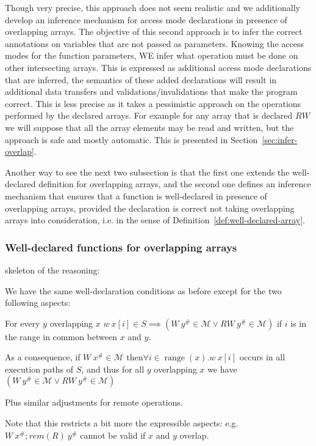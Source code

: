 \documentclass[preprint,12pt]{elsarticle}
\newcommand{\symb}[1]{\textit{#1}}
\newcommand{\rem}[1]{\symb{rem}(#1)}
\newcommand{\abs}[1]{#1^\#}
\newcommand{\AM}{\mathcal{M}}
\DeclareMathOperator{\range}{range}
\begin{document}
Though very precise, this approach does not seem realistic and we additionally develop an inference mechanism for access mode declarations in presence of overlapping arrays.
The objective of this second approach is to infer the correct annotations on  variables that are not passed as parameters. Knowing the access modes for the function parameters, WE infer what operation must be done on other intersecting arrays. This is expressed as additional access mode declarations that are inferred, the semantics of these added declarations will result in additional data transfers and validations/invalidations that make the program correct. This is less precise as it takes a pessimistic approach on the operations performed by the declared arrays. For example for any array that is declared $RW$ we will suppose that all the array elements may be read and written, but the approach is safe and mostly automatic. This is presented in Section~\ref{sec:infer-overlap}. 

Another way to see the next two subsection is that the first one extends the well-declared definition for overlapping arrays, and the second one defines an inference mechanism that ensures that a function is well-declared in presence of overlapping arrays, provided the declaration is correct not taking overlapping arrays into consideration, i.e. in the sense of Definition~\ref{def:well-declared-array}.

\subsubsection{Well-declared functions for overlapping arrays}\label{sec:Well-declared-overlap}
skeleton of the reasoning:

We have the same well-declaration conditions as before except for the two following aspects:

For every $y$ overlapping $x$
 $w\ x[i]\in S \implies (W\ \abs y \in \AM \lor RW\ \abs y \in \AM)$ if $i$ is in the range in common between $x$ and $y$.

As a consequence, if
$W\ \abs x\in \AM$ then$ \forall i\in\range(x). w\ x[i]$ occurs in all execution 
paths of $S$, and thus for all $y$ overlapping $x$  we have $(W\ \abs y \in \AM \lor RW\ \abs y \in \AM)$

Plus similar adjustments for remote operations.

Note that this restricts a bit more the expressible aspects: e.g. $W\ \abs x ; \rem{R}\ \abs y$ cannot be valid if $x$ and $y$ overlap.
\end{document}
